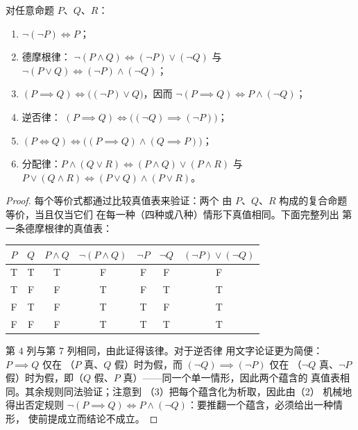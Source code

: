 \begin{proposition}[命题演算的规则]\label{prop:b1:logic:rules}
对任意命题 $P$、$Q$、$R$：
\begin{enumerate}
  \item $\lnot(\lnot P) \iff P$；
  \item 德摩根律：
        $\lnot(P \land Q) \iff (\lnot P) \lor (\lnot Q)$ 与
        $\lnot(P \lor Q) \iff (\lnot P) \land (\lnot Q)$；
  \item $(P \implies Q) \iff \bigl((\lnot P) \lor Q\bigr)$，因而
        $\lnot(P \implies Q) \iff P \land (\lnot Q)$；
  \item 逆否律：
        $(P \implies Q) \iff \bigl((\lnot Q) \implies (\lnot P)\bigr)$；
  \item $(P \iff Q) \iff \bigl((P \implies Q) \land (Q \implies
        P)\bigr)$；
  \item 分配律：$P \land (Q \lor R) \iff (P \land Q) \lor
        (P \land R)$ 与 $P \lor (Q \land R) \iff (P \lor Q) \land
        (P \lor R)$。
\end{enumerate}
\end{proposition}

\begin{proof}
每个等价式都通过比较真值表来验证：两个
由 $P$、$Q$、$R$ 构成的复合命题等价，当且仅当它们
在每一种（四种或八种）情形下真值相同。下面完整列出
第一条德摩根律的真值表：
\begin{center}
\begin{tabular}{cc|c|c|cc|c}
$P$ & $Q$ & $P \land Q$ & $\lnot(P \land Q)$ & $\lnot P$ & $\lnot Q$ &
$(\lnot P) \lor (\lnot Q)$ \\
\hline
T & T & T & F & F & F & F \\
T & F & F & T & F & T & T \\
F & T & F & T & T & F & T \\
F & F & F & T & T & T & T \\
\end{tabular}
\end{center}
第 $4$ 列与第 $7$ 列相同，由此证得该律。对于逆否律
用文字论证更为简便：$P \implies Q$ 仅在
（$P$ 真、$Q$ 假）时为假，而 $(\lnot Q) \implies (\lnot P)$ 仅在
（$\lnot Q$ 真、$\lnot P$ 假）时为假，即（$Q$
假、$P$ 真）——同一个单一情形，因此两个蕴含的
真值表相同。其余规则同法验证；注意到
（3）把每个蕴含化为析取，因此由（2）
机械地得出否定规则 $\lnot(P \implies Q) \iff P
\land (\lnot Q)$：要推翻一个蕴含，必须给出一种情形，
使前提成立而结论不成立。
\end{proof}

